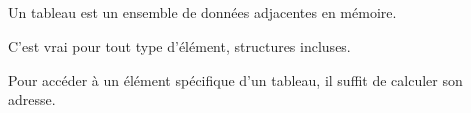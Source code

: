 ﻿\subsection{\Conclusion{}}

Un tableau est un ensemble de données adjacentes en mémoire.

C'est vrai pour tout type d'élément, structures incluses.

Pour accéder à un élément spécifique d'un tableau, il suffit de calculer son adresse.
